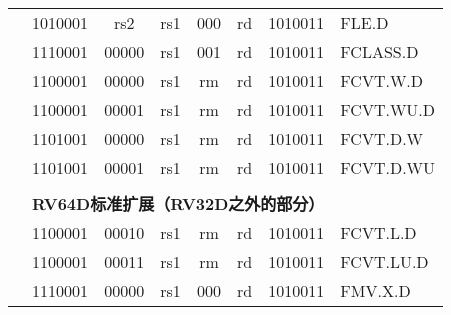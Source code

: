 \begin{table}[p]
\begin{small}
\begin{center}
\begin{tabular}{p{0in}p{0.4in}p{0.05in}p{0.05in}p{0.05in}p{0.05in}p{0.4in}p{0.6in}p{0.4in}p{0.6in}p{0.7in}l}
&
\multicolumn{4}{|c|}{1010001} &
\multicolumn{2}{c|}{rs2} &
\multicolumn{1}{c|}{rs1} &
\multicolumn{1}{c|}{000} &
\multicolumn{1}{c|}{rd} &
\multicolumn{1}{c|}{1010011} & FLE.D \\
\cline{2-11}


&
\multicolumn{4}{|c|}{1110001} &
\multicolumn{2}{c|}{00000} &
\multicolumn{1}{c|}{rs1} &
\multicolumn{1}{c|}{001} &
\multicolumn{1}{c|}{rd} &
\multicolumn{1}{c|}{1010011} & FCLASS.D \\
\cline{2-11}


&
\multicolumn{4}{|c|}{1100001} &
\multicolumn{2}{c|}{00000} &
\multicolumn{1}{c|}{rs1} &
\multicolumn{1}{c|}{rm} &
\multicolumn{1}{c|}{rd} &
\multicolumn{1}{c|}{1010011} & FCVT.W.D \\
\cline{2-11}


&
\multicolumn{4}{|c|}{1100001} &
\multicolumn{2}{c|}{00001} &
\multicolumn{1}{c|}{rs1} &
\multicolumn{1}{c|}{rm} &
\multicolumn{1}{c|}{rd} &
\multicolumn{1}{c|}{1010011} & FCVT.WU.D \\
\cline{2-11}


&
\multicolumn{4}{|c|}{1101001} &
\multicolumn{2}{c|}{00000} &
\multicolumn{1}{c|}{rs1} &
\multicolumn{1}{c|}{rm} &
\multicolumn{1}{c|}{rd} &
\multicolumn{1}{c|}{1010011} & FCVT.D.W \\
\cline{2-11}


&
\multicolumn{4}{|c|}{1101001} &
\multicolumn{2}{c|}{00001} &
\multicolumn{1}{c|}{rs1} &
\multicolumn{1}{c|}{rm} &
\multicolumn{1}{c|}{rd} &
\multicolumn{1}{c|}{1010011} & FCVT.D.WU \\
\cline{2-11}


&
\multicolumn{10}{c}{} & \\
&
\multicolumn{10}{c}{\bf RV64D标准扩展（RV32D之外的部分）} & \\
\cline{2-11}


&
\multicolumn{4}{|c|}{1100001} &
\multicolumn{2}{c|}{00010} &
\multicolumn{1}{c|}{rs1} &
\multicolumn{1}{c|}{rm} &
\multicolumn{1}{c|}{rd} &
\multicolumn{1}{c|}{1010011} & FCVT.L.D \\
\cline{2-11}


&
\multicolumn{4}{|c|}{1100001} &
\multicolumn{2}{c|}{00011} &
\multicolumn{1}{c|}{rs1} &
\multicolumn{1}{c|}{rm} &
\multicolumn{1}{c|}{rd} &
\multicolumn{1}{c|}{1010011} & FCVT.LU.D \\
\cline{2-11}


&
\multicolumn{4}{|c|}{1110001} &
\multicolumn{2}{c|}{00000} &
\multicolumn{1}{c|}{rs1} &
\multicolumn{1}{c|}{000} &
\multicolumn{1}{c|}{rd} &
\multicolumn{1}{c|}{1010011} & FMV.X.D \\
\cline{2-11}



\end{tabular}
\end{center}
\end{small}
\end{table}
